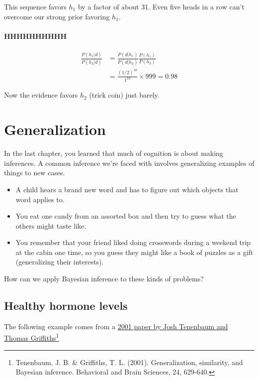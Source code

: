 \documentclass[
  letterpaper,
  DIV=11,
  numbers=noendperiod]{scrreprt}
\providecommand{\tightlist}{%
  \setlength{\itemsep}{0pt}\setlength{\parskip}{0pt}}
\begin{document}
This sequence favors \(h_1\) by a factor of about 31. Even five heads in
a row can't overcome our strong prior favoring \(h_1\).

\subsubsection*{HHHHHHHHHH}\label{hhhhhhhhhh}

\[
\begin{align}
\frac{P(h_1|d)}{P(h_2|d)} &= \frac{P(d|h_1)}{P(d|h_2)} \frac{P(h_1)}{P(h_2)} \\
&= \frac{(1/2)^{10}}{1^{10}} \times 999 = 0.98
\end{align}
\]

Now the evidence favors \(h_2\) (trick coin) just barely.


\chapter{Generalization}\label{generalization}

In the last chapter, you learned that much of cognition is about making
inferences. A common inference we're faced with involves generalizing
examples of things to new cases.

\begin{itemize}
\tightlist
\item
  A child hears a brand new word and has to figure out which objects
  that word applies to.
\item
  You eat one candy from an assorted box and then try to guess what the
  others might taste like.
\item
  You remember that your friend liked doing crosswords during a weekend
  trip at the cabin one time, so you guess they might like a book of
  puzzles as a gift (generalizing their interests).
\end{itemize}

How can we apply Bayesian inference to these kinds of problems?

\section{Healthy hormone levels 💉}\label{hormones}

The following example comes from a
\href{https://cocosci.princeton.edu/tom/papers/TGbbs.pdf}{2001 paper by
Josh Tenenbaum and Thomas Griffiths}\footnote{Tenenbaum, J. B. \&
  Griffiths, T. L. (2001). Generalization, similarity, and Bayesian
  inference. Behavioral and Brain Sciences, 24, 629-640.}
\end{document}
